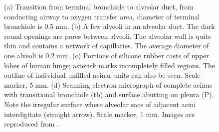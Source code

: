 \begin{figure}[H]
\begin{center}
\caption{(a) Transition from terminal bronchiole to alveolar duct, from conducting airway to oxygen transfer area, diameter of terminal bronchiole is $0.5 \;\mbox{mm}$. (b) A few alveoli in an alveolar duct. The dark round openings are pores between alveoli. The alveolar wall is quite thin and contains a network of capillaries. The average diameter of one alveoli is $0.2\;\mbox{mm}$.  (c) Portions of silicone rubber casts of upper lobes
of human lungs; asterisk marks incompletely filled regions. The outline of individual unfilled acinar units can also be seen. Scale marker, $5\;\mbox{mm}$. (d) Scanning electron micrograph of complete acinus with transitional bronchiole
(tb) and surface abutting on pleura (P). Note the irregular surface where alveolar sacs of adjacent acini interdigitate (straight arrow). Scale marker, 1 mm. Images are reproduced from \citet{lunglabshort}.
 }
  \end{center}
   \label{fig:acinar_units}
\end{figure}
%
\begin{table}[h]
\begin{center}
\end{center}
\caption{Shows dimensions, velocity and the corresponding Reynolds number for different sections of the airway tree during slow and rapid breathing. 
These values have been taken from \citet{pedley1970prediction}. }
\label{table:tree}
\end{table}
